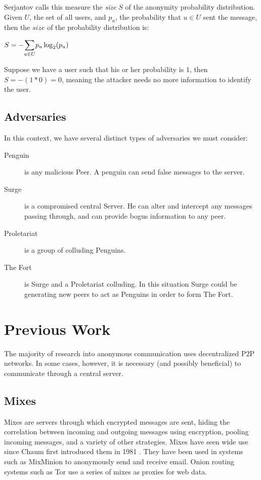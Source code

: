 \documentclass[twocolumn,11pt,english]{article}
\begin{document}
Serjantov \cite{Serj02} calls this measure the \textit{size} $S$ of the anonymity probability distribution. Given $U$, the set of all users, and $p_u$, the probability that $u \in U$ sent the message, then the $size$ of the probability distribution is:

\begin{center}
  $ S = - \mathlarger{\sum}\limits_{u \in U} p_u \log_2(p_u)$
\end{center}

Suppose we have a user such that his or her probability is $1$, then  $S = -(1 * 0) = 0$, meaning the attacker needs no more information to identify the user. 


\subsection{Adversaries}
In this context, we have several distinct types of adversaries we must consider:
\begin{description}
\item[Penguin] 
  is any malicious Peer. A penguin can send false messages to the server. 
\item[Surge] 
  is a compromised central Server. He can alter and intercept any messages passing through, and can provide bogus information to any peer.
\item[Proletariat] 
  is a group of colluding Penguins.
\item[The Fort] 
  is Surge and a Proletariat colluding. In this situation Surge could be generating new peers to act as Penguins in order to form The Fort.
\end{description}

\section{Previous Work}
The majority of research into anonymous communication uses decentralized P2P networks. In some cases, however, it is necessary (and possibly beneficial) to communicate through a central server. 

\subsection{Mixes}
Mixes are servers through which encrypted messages are sent, hiding the correlation between incoming and outgoing messages using encryption, pooling incoming messages, and a variety of other strategies. Mixes have seen wide use since Chaum first introduced them in 1981 \cite{chaum-mix}. They have been used in systems such as MixMinion\cite{minion-design} to anonymously send and receive email. Onion routing systems such as Tor \cite{tor-design} use a series of mixes as proxies for web data. 
\end{document}
